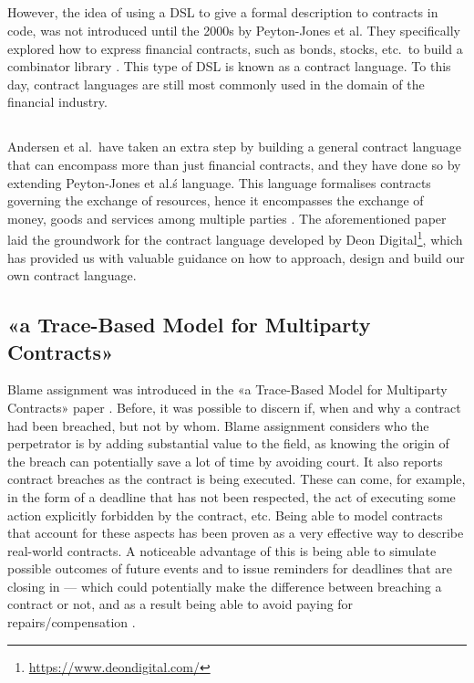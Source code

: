\documentclass{ituthesis}
\begin{document}
\subsection{} %

However, the idea of using a DSL to give a formal description to contracts in code, was not introduced until the 2000s by Peyton-Jones et al. They specifically explored how to express financial contracts, such as bonds, stocks, etc.\ to build a combinator library \cite{peyton2000composing}. This type of DSL is known as a contract language. To this day, contract languages are still most commonly used in the domain of the financial industry.

\subsection{} %

Andersen et al.\ have taken an extra step by building a general contract language that can encompass more than just financial contracts, and they have done so by extending Peyton-Jones et al.\'s language. This language formalises contracts governing the exchange of resources, hence it encompasses the exchange of money, goods and services among multiple parties \cite{andersen2006compositional}. The aforementioned paper laid the groundwork for the contract language developed by Deon Digital\footnote{\url{https://www.deondigital.com/}}, which has provided us with valuable guidance on how to approach, design and build our own contract language.

\subsection{«a Trace-Based Model for Multiparty Contracts»}

Blame assignment was introduced in the «a Trace-Based Model for Multiparty Contracts» paper \cite{hvitved2012trace}. Before, it was possible to discern if, when and why a contract had been breached, but not by whom. Blame assignment considers who the perpetrator is by adding substantial value to the field, as knowing the origin of the breach can potentially save a lot of time by avoiding court. It also reports contract breaches as the contract is being executed. These can come, for example, in the form of a deadline that has not been respected, the act of executing some action explicitly forbidden by the contract, etc. Being able to model contracts that account for these aspects has been proven as a very effective way to describe real-world contracts. A noticeable advantage of this is being able to simulate possible outcomes of future events and to issue reminders for deadlines that are closing in --- which could potentially make the difference between breaching a contract or not, and as a result being able to avoid paying for repairs/compensation \cite{hvitved2012trace}.
\end{document}
